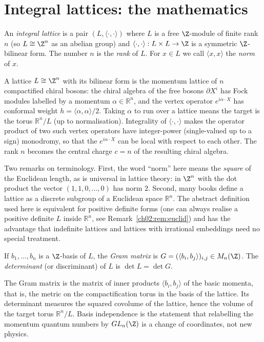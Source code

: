 \section{Integral lattices: the mathematics}\label{ch02:sec:lattices}

\begin{definition}\label{ch02:def:lattice}
An \emph{integral lattice} is a pair $(L,\langle\cdot,\cdot\rangle)$ where $L$ is a free
$\Z$-module of finite rank $n$ (so $L\cong\Z^n$ as an abelian group) and
$\langle\cdot,\cdot\rangle:L\times L\to\Z$ is a symmetric $\Z$-bilinear form.  The number $n$ is
the \emph{rank} of $L$.  For $x\in L$ we call $\langle x,x\rangle$ the \emph{norm} of $x$.
\end{definition}
\begin{physics}
A lattice $L\cong\Z^n$ with its bilinear form is the momentum lattice of $n$ compactified chiral bosons: the chiral algebra of the free bosons $\partial X^i$ has Fock modules labelled by a momentum $\alpha\in\mathbb{R}^n$, and the vertex operator $e^{i\alpha\cdot X}$ has conformal weight $h=\langle\alpha,\alpha\rangle/2$. Taking $\alpha$ to run over a lattice means the target is the torus $\mathbb{R}^n/L$ (up to normalisation). Integrality of $\langle\cdot,\cdot\rangle$ makes the operator product of two such vertex operators have integer-power (single-valued up to a sign) monodromy, so that the $e^{i\alpha\cdot X}$ can be local with respect to each other. The rank $n$ becomes the central charge $c=n$ of the resulting chiral algebra.
\end{physics}

Two remarks on terminology.  First, the word ``norm'' here means the \emph{square} of the
Euclidean length, as is universal in lattice theory: in $\Z^n$ with the dot product the vector
$(1,1,0,\dots,0)$ has norm $2$.  Second, many books define a lattice as a discrete subgroup of a
Euclidean space $\mathbb{R}^n$.  The abstract definition used here is equivalent for positive
definite forms (one can always realise a positive definite $L$ inside $\mathbb{R}^n$, see
Remark~\ref{ch02:rem:euclid}) and has the advantage that indefinite lattices and lattices with
irrational embeddings need no special treatment.

\begin{definition}\label{ch02:def:gram}
If $b_1,\dots,b_n$ is a $\Z$-basis of $L$, the \emph{Gram matrix} is
$G=(\langle b_i,b_j\rangle)_{i,j}\in M_n(\Z)$.  The \emph{determinant} (or discriminant) of $L$ is
$\det L=\det G$.
\end{definition}
\begin{physics}
The Gram matrix is the matrix of inner products $\langle b_i,b_j\rangle$ of the basic momenta, that is, the metric on the compactification torus in the basis of the lattice. Its determinant measures the squared covolume of the lattice, hence the volume of the target torus $\mathbb{R}^n/L$. Basis independence is the statement that relabelling the momentum quantum numbers by $GL_n(\Z)$ is a change of coordinates, not new physics.
\end{physics}

